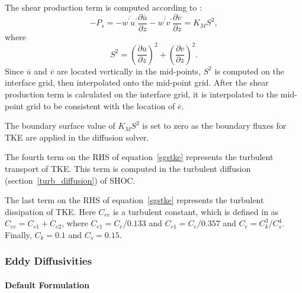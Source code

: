 The shear production term is computed according to \cite{bretherton2009_moist}:
%
\begin{equation}
  -P_{s}= -\overline{w^{'}u^{'}}\frac{\partial{\overline{u}}}{\partial{z}}-\overline{w^{'}v^{'}}\frac{\partial{\overline{v}}}{\partial{z}} = K_{M}S^{2} , 
  \label{shearprod}
\end{equation}
%
where
\begin{equation}
  S^{2} = \left(\frac{\partial{\overline{u}}}{\partial{z}}\right)^2+\left(\frac{\partial{\overline{v}}}{\partial{z}}\right)^2 . 
  \label{tke_Sterm}
\end{equation}
%
Since $\overline{u}$ and $\overline{v}$ are located vertically in the mid-points, $S^{2}$ is computed on the interface grid, then interpolated onto the mid-point grid.  After the shear production term is calculated on the interface grid, it is interpolated to the mid-point grid to be consistent with the location of $\overline{e}$. 

The boundary surface value of $K_{M}S^{2}$ is set to zero as the boundary fluxes for TKE are applied in the diffusion solver.  

The fourth term on the RHS of equation~\ref{sgstke} represents the turbulent transport of TKE.  This term is computed in the turbulent diffusion (section~\ref{turb_diffusion}) of SHOC.  

The last term on the RHS of equation~\ref{sgstke} represents the turbulent dissipation of TKE.  Here $C_{ee}$ is a turbulent constant, which is defined in \cite{Deardorff_80} as $C_{ee}=C_{e1}+C_{e2}$, where $C_{e1} = C_{e}/0.133$ and $C_{e1} = C_{e}/0.357$ and $C_{e}=C_{k}^{3}/C_{s}^{4}$.  Finally, $C_{k} = 0.1$ and $C_{s} = 0.15$.  

\subsubsection{Eddy Diffusivities}

\paragraph{Default Formulation}

